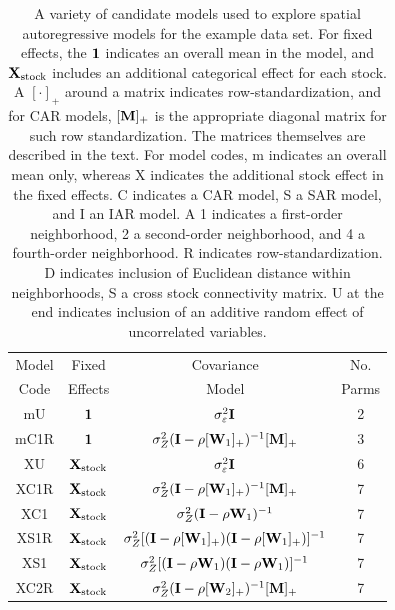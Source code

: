 \documentclass[11pt, titlepage]{article}\usepackage[]{graphicx}\usepackage[]{color}
\begin{document}
\begin{spacing}{1.9}
\begin{flushleft}

\begin{table}[ht]
	\caption{A variety of candidate models used to explore spatial autoregressive models for the example data set.  For fixed effects, the $\mathbf{1}$ indicates an overall mean in the model, and $\mathbf{X}_\textrm{stock}$ includes an additional categorical effect for each stock.  A $[\cdot]_+$ around a matrix indicates row-standardization, and for CAR models, $[\mathbf{M}]_+$ is the appropriate diagonal matrix for such row standardization. The matrices themselves are described in the text. For model codes, m indicates an overall mean only, whereas X indicates the additional stock effect in the fixed effects.  C indicates a CAR model, S a SAR model, and I an IAR model.  A 1 indicates a first-order neighborhood, 2 a second-order neighborhood, and 4 a fourth-order neighborhood.  R indicates row-standardization. D indicates inclusion of Euclidean distance within neighborhoods, S a cross stock connectivity matrix.  U at the end indicates inclusion of an additive random effect of uncorrelated variables.  \label{Tab:Models}}
\begin{center}
\begin{tabular}{c|c|c|c}
  \hline
  \hline
  Model & Fixed & Covariance & No. \\ 
  Code & Effects & Model & Parms \\
  \hline
  mU & $\mathbf{1}$ & $\sigma_\varepsilon^2\mathbf{I}$ & 2 \\
  mC1R & $\mathbf{1}$ & $\sigma_Z^2(\mathbf{I} - \rho[\mathbf{W}_1]_+)^{-1}[\mathbf{M}]_+$ & 3 \\
  XU & $\mathbf{X}_{\textrm{stock}}$ & $\sigma_\varepsilon^2\mathbf{I}$ & 6 \\
  XC1R & $\mathbf{X}_{\textrm{stock}}$ & $\sigma_Z^2(\mathbf{I} - \rho[\mathbf{W}_1]_+)^{-1}[\mathbf{M}]_+$ & 7 \\
  XC1 & $\mathbf{X}_{\textrm{stock}}$ & $\sigma_Z^2(\mathbf{I} - \rho\mathbf{W}_1)^{-1}$ & 7 \\
  XS1R & $\mathbf{X}_{\textrm{stock}}$ & $\sigma_Z^2[(\mathbf{I} - \rho[\mathbf{W}_1]_+)(\mathbf{I} - \rho[\mathbf{W}_1]_+)]^{-1}$ & 7 \\
  XS1 & $\mathbf{X}_{\textrm{stock}}$ & $\sigma_Z^2[(\mathbf{I} - \rho\mathbf{W}_{1})(\mathbf{I} - \rho\mathbf{W}_{1})]^{-1}$ & 7 \\
  XC2R & $\mathbf{X}_{\textrm{stock}}$ & $\sigma_Z^2(\mathbf{I} - \rho[\mathbf{W}_2]_+)^{-1}[\mathbf{M}]_+$ & 7 \\

\end{tabular}
\end{center}
\end{table}
\end{flushleft}
\end{spacing}
\end{document}
